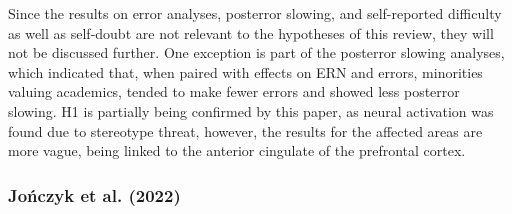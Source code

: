 \documentclass[
  stu,floatsintext]{apa7}
\begin{document}
Since the results on error analyses, posterror slowing, and self-reported difficulty as well as self-doubt are not relevant to the hypotheses of this review, they will not be discussed further.
One exception is part of the posterror slowing analyses, which indicated that, when paired with effects on ERN and errors, minorities valuing academics, tended to make fewer errors and showed less posterror slowing.
H1 is partially being confirmed by this paper, as neural activation was found due to stereotype threat, however, the results for the affected areas are more vague, being linked to the anterior cingulate of the prefrontal cortex.

\subsubsection{Jończyk et al. (2022)}\label{jonczykhowstereotypethreat2022}
\end{document}
